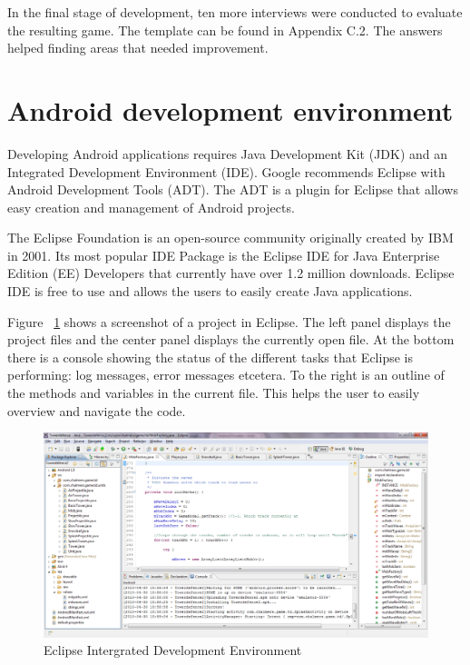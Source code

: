 In the final stage of development, ten more interviews were conducted to evaluate the resulting game. The template can be found in Appendix C.2. The answers helped finding areas that needed improvement.
\section{Android development environment}

Developing Android applications requires Java Development Kit (JDK) and an Integrated Development Environment (IDE). Google recommends Eclipse with Android Development Tools (ADT). The ADT is a plugin for Eclipse that allows easy creation and management of Android projects. \citep{Android}

The Eclipse Foundation is an open-source community originally created by IBM in 2001. Its most popular IDE Package is the Eclipse IDE for Java Enterprise Edition (EE) Developers that currently have over 1.2 million downloads. Eclipse IDE is free to use and allows the users to easily create Java applications. \citep{Eclipse}

Figure ~\ref{fig:eclipseIDE} shows a screenshot of a project in Eclipse. The left panel displays the project files and the center panel displays the currently open file. At the bottom there is a console showing the status of the different tasks that Eclipse is performing: log messages, error messages etcetera. To the right is an outline of the methods and variables in the current file. This helps the user to easily overview and navigate the code.

\begin{figure}[here]
\begin{center}
\includegraphics[scale=0.3]{pics/chapters/chapter2/eclipse}
\end{center}
\caption{Eclipse Intergrated Development Environment}
\label{fig:eclipseIDE}
\end{figure}

